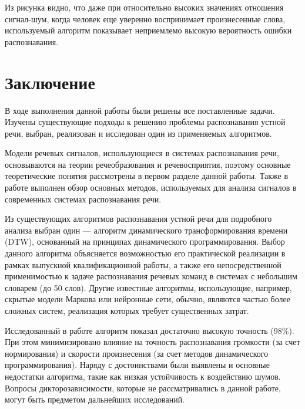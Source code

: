 \documentclass[a4paper,14pt,russian,utf8,nocolumnsxix,nocolumnxxxi,nocolumnxxxii]{eskdtext}
\begin{document}
Из рисунка видно, что даже при относительно высоких значениях отношения сигнал-шум, когда человек еще уверенно воспринимает произнесенные слова, используемый алгоритм показывает неприемлемо высокую вероятность ошибки распознавания.
\pagebreak

\section*{Заключение}

В ходе выполнения данной работы были решены все поставленные задачи. Изучены существующие подходы к решению проблемы распознавания устной речи, выбран, реализован и исследован один из применяемых алгоритмов.

Модели речевых сигналов, использующиеся в системах распознавания речи, основываются на теории речеобразования и речевосприятия, поэтому основные теоретические понятия рассмотрены в первом разделе данной работы. Также в работе выполнен обзор основных методов, используемых для анализа сигналов в современных системах распознавания речи.

Из существующих алгоритмов распознавания устной речи для подробного анализа выбран один --- алгоритм динамического трансформирования времени (DTW), основанный на принципах динамического программирования. Выбор данного алгоритма объясняется возможностью его практической реализации в рамках выпускной квалификационной работы, а также его непосредственной применимостью к задаче распознавания речевых команд в системах с небольшим словарем (до 50 слов). Другие известные алгоритмы,  использующие, например, скрытые модели Маркова или нейронные сети, обычно, являются частью более сложных систем, реализация которых требует существенных затрат.

Исследованный в работе алгоритм показал достаточно высокую точность (98\%). При этом минимизировано влияние на точность распознавания громкости (за счет нормирования) и скорости произнесения (за счет методов динамического программирования). Наряду с достоинствами были выявлены и основные недостатки алгоритма, такие как низкая устойчивость к воздействию шумов. Вопросы дикторозависимости, которые не рассматривались в данной работе, могут быть предметом дальнейших исследований.
\end{document}
